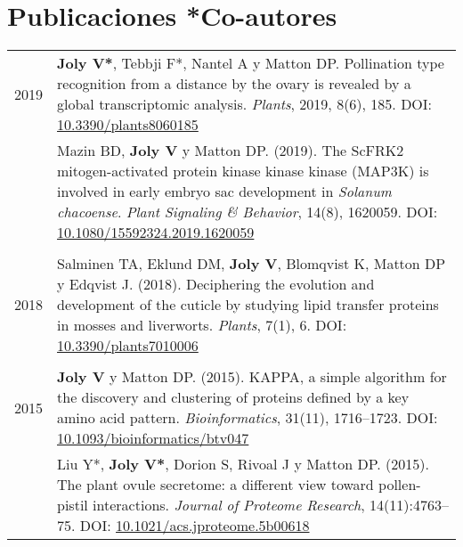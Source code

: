 \documentclass[letterpaper,12pt]{article}
\begin{document}
\vspace{6mm}

\section[Publicaciones]{Publicaciones \hfill \small{*Co-autores}}

\begin{tabularx}{\textwidth}{@{}r|X@{}}


2019
& \textbf{Joly V*}, Tebbji F*, Nantel A y Matton DP.
  Pollination type recognition from a distance by the ovary is revealed by a
  global transcriptomic analysis.
  \emph{Plants}, 2019, 8(6), 185.
  DOI: \href{http://doi.org/10.3390/plants8060185}{10.3390/plants8060185}
  \vspace{3mm}
  \\

& Mazin BD, \textbf{Joly V} y Matton DP. (2019).
  The ScFRK2 mitogen-activated protein kinase kinase kinase (MAP3K) is involved
  in early embryo sac development in \emph{Solanum chacoense}.
  \emph{Plant Signaling \& Behavior}, 14(8), 1620059.
  DOI: \href{http://doi.org/10.1080/15592324.2019.1620059}
  {10.1080/15592324.2019.1620059}
  \\

\multicolumn{2}{c}{} \\

2018
& Salminen TA, Eklund DM, \textbf{Joly V}, Blomqvist K, Matton DP
  y Edqvist J. (2018).
  Deciphering the evolution and development of the cuticle by studying lipid
  transfer proteins in mosses and liverworts.
  \emph{Plants}, 7(1), 6.
  DOI: \href{http://doi.org/10.3390/plants7010006}{10.3390/plants7010006}
  \\

\multicolumn{2}{c}{} \\

2015
& \textbf{Joly V} y Matton DP. (2015).
  KAPPA, a simple algorithm for the discovery and clustering of proteins defined
  by a key amino acid pattern.
  \emph{Bioinformatics}, 31(11), 1716--1723.
  DOI: \href{http://doi.org/10.1093/bioinformatics/btv047}
  {10.1093/bioinformatics/btv047}
  \vspace{3mm}
  \\

& Liu Y*, \textbf{Joly V*}, Dorion S, Rivoal J y Matton DP. (2015).
  The plant ovule secretome: a different view toward pollen-pistil interactions.
  \emph{Journal of Proteome Research}, 14(11):4763--75.
  DOI: \href{http://doi.org/10.1021/acs.jproteome.5b00618}
  {10.1021/acs.jproteome.5b00618}
  \vspace{3mm}
  \\


\end{tabularx}
\end{document}
